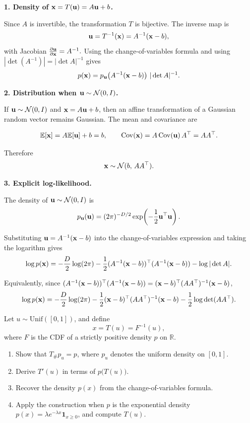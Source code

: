 \begin{solution}

\textbf{1. Density of ${ \mathbf{x}} = T({ \mathbf{u}}) = A{ \mathbf{u}} + b$.}

Since $A$ is invertible, the transformation $T$ is bijective. The inverse map is
\[
{ \mathbf{u}} = T^{-1}({ \mathbf{x}}) = A^{-1}({ \mathbf{x}} - b),
\]
with Jacobian
\(
\frac{\partial { \mathbf{u}}}{\partial { \mathbf{x}}} = A^{-1}.
\)
Using the change-of-variables formula and using $|\det(A^{-1})| = |\det A|^{-1}$ gives 
\[
p({ \mathbf{x}}) = p_{ \mathbf{u}}\!\left(A^{-1}({ \mathbf{x}}-b)\right)\,|\det A|^{-1}.
\]

\bigskip

\textbf{2. Distribution when ${ \mathbf{u}} \sim \mathcal N(0,I)$.}

If ${ \mathbf{u}} \sim \mathcal N(0,I)$ and ${ \mathbf{x}} = A{ \mathbf{u}} + b$, then an affine transformation of a Gaussian random vector remains Gaussian. The mean and covariance are

\[
\mathbb{E}[{ \mathbf{x}}] = A\mathbb{E}[{ \mathbf{u}}] + b = b,
\qquad
\mathrm{Cov}({ \mathbf{x}}) = A\,\mathrm{Cov}({ \mathbf{u}})\,A^\top = AA^\top.
\]

Therefore
\[
{ \mathbf{x}} \sim \mathcal N(b,\, AA^\top).
\]

\bigskip

\textbf{3. Explicit log-likelihood.}

The density of ${ \mathbf{u}} \sim \mathcal N(0,I)$ is
\[
p_{ \mathbf{u}}({ \mathbf{u}}) = (2\pi)^{-D/2}\exp\!\left(-\frac12 { \mathbf{u}}^\top{ \mathbf{u}}\right).
\]

Substituting ${ \mathbf{u}} = A^{-1}({ \mathbf{x}}-b)$ into the change-of-variables expression and taking the logarithm gives
\[
\log p({ \mathbf{x}})
=
-\frac{D}{2}\log(2\pi)
-\frac12 (A^{-1}({ \mathbf{x}}-b))^\top (A^{-1}({ \mathbf{x}}-b))
-\log |\det A|.
\]

Equivalently, since $(A^{-1}({ \mathbf{x}}-b))^\top (A^{-1}({ \mathbf{x}}-b)) = ({ \mathbf{x}}-b)^\top (AA^\top)^{-1}({ \mathbf{x}}-b)$,
\[
\log p({ \mathbf{x}})
=
-\frac{D}{2}\log(2\pi)
-\frac12 ({ \mathbf{x}}-b)^\top (AA^\top)^{-1}({ \mathbf{x}}-b)
-\frac12 \log \det(AA^\top).
\]

\end{solution}

\begin{exercise}
Let \(u\sim \mathrm{Unif}([0,1])\), and define
\[
x=T(u)=F^{-1}(u),
\]
where \(F\) is the CDF of a strictly positive density \(p\) on \(\mathbb{R}\).

\begin{enumerate}
\item Show that \(T_\# p_u = p\), where \(p_u\) denotes the uniform density on \([0,1]\).
\item Derive \(T'(u)\) in terms of \(p\bigl(T(u)\bigr)\).
\item Recover the density \(p(x)\) from the change-of-variables formula.
\item Apply the construction when \(p\) is the exponential density \(p(x)=\lambda e^{-\lambda x}\mathbf{1}_{x\ge 0}\), and compute \(T(u)\).
\end{enumerate}
\end{exercise}


